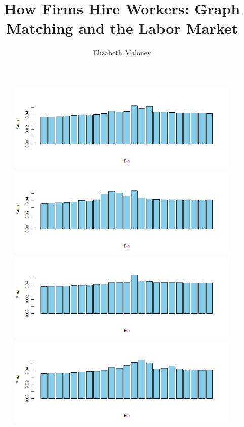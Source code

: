 \documentclass[11pt]{article}
\theoremstyle{plain}
\theoremstyle{definition}
\begin{document}
 

\title{How Firms Hire Workers: Graph Matching and the Labor Market}
\author{Elizabeth Maloney}
\begin{figure}[H]
\begin{center}
\includegraphics[trim ={3.5cm 2.7cm 2cm 2cm},scale=.6, clip=true]{Binned_Areas13.png}
\includegraphics[trim ={3.5cm 2.7cm 2cm 2cm},scale=.6, clip=true]{Binned_Areas14.png}
\includegraphics[trim ={3.5cm 2.7cm 2cm 2cm},scale=.6, clip=true]{Binned_Areas15.png}
\includegraphics[trim ={3.5cm 2.7cm 2cm 2cm},scale=.6, clip=true]{Binned_Areas16.png}

\end{center}
\end{figure}
\end{document}

